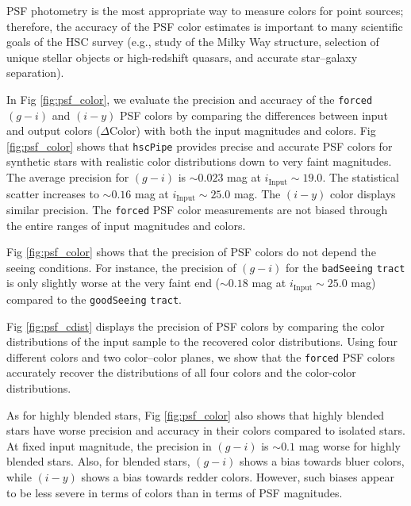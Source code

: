 \documentclass[useamsfonts]{pasj01}
\def\hscpipe{\texttt{hscPipe}}
\def\forced{\texttt{forced}}
\def\tract{\texttt{tract}}
\begin{document}
    PSF photometry is the most appropriate way to measure colors for point
    sources; therefore, the accuracy of the PSF color estimates is important to many 
    scientific goals of the HSC survey
    (e.g., study of the Milky Way structure, selection of unique stellar objects or
    high-redshift quasars, and accurate star--galaxy separation).

    In Fig \ref{fig:psf_color}, we evaluate the precision and accuracy of the 
    \forced{} $(g-i)$ and $(i-y)$ PSF colors by comparing the differences between input 
    and output colors ($\Delta \mathrm{Color}$) with both the input magnitudes and 
    colors. 
    Fig \ref{fig:psf_color} shows that \hscpipe{} provides precise and accurate PSF 
    colors for synthetic stars with realistic color distributions down to very 
    faint magnitudes. 
    The average precision for $(g-i)$ is ${\sim}0.023$ mag at 
    $i_{\mathrm{Input}}{\sim}19.0$. 
    The statistical scatter increases to ${\sim}0.16$ mag at 
    $i_{\mathrm{Input}}{\sim}25.0$ mag.  
    The $(i-y)$ color displays similar precision. 
    The \forced{} PSF color measurements are not biased through the entire ranges of 
    input magnitudes and colors.
    
    Fig \ref{fig:psf_color} shows that the precision of PSF colors do not depend 
    the seeing conditions. 
    For instance, the precision of $(g-i)$ for the \texttt{badSeeing} \tract{} is 
    only slightly worse at the very faint end (${\sim}0.18$ mag at
    $i_{\mathrm{Input}}{\sim}25.0$ mag) compared to the \texttt{goodSeeing} \tract{}.

    Fig \ref{fig:psf_cdist} displays the precision of PSF colors by comparing the 
    color distributions of the input sample to the recovered color distributions. 
    Using four different colors and two color--color planes, we show that the 
    \forced{} PSF colors accurately recover the distributions of all four colors 
    and the color-color distributions.

    As for highly blended stars, Fig \ref{fig:psf_color} also shows that highly blended 
    stars have worse precision and accuracy in their colors compared to isolated stars. 
    At fixed input magnitude, the precision in $(g-i)$ is ${\sim}0.1$ mag worse for 
    highly blended stars.  
    Also, for blended stars, $(g-i)$ shows a bias towards bluer colors, while $(i-y)$ 
    shows a bias towards redder colors. 
    However, such biases appear to be less severe in terms of colors than in terms of
    PSF magnitudes.
    
\end{document}

